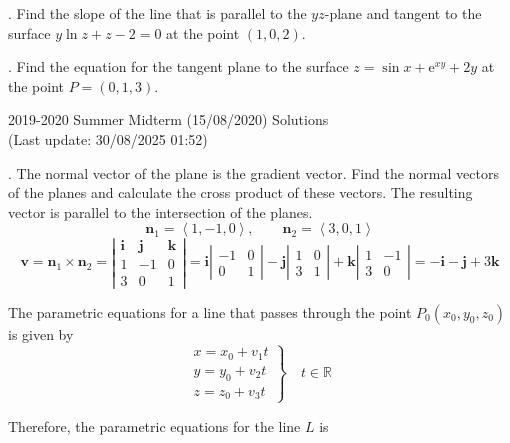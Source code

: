 \documentclass{article}
\begin{document}
\hfill

. Find the slope of the line that is parallel to the $yz$-plane and tangent to the surface $y\ln z+z-2=0$ at the point $(1,0,2)$.

\hfill

. Find the equation for the tangent plane to the surface $z=\sin x+\mathrm{e}^{xy}+2y$ at the point $P=(0,1,3)$.

\newpage

\begin{center}
2019-2020 Summer Midterm (15/08/2020) Solutions\\
(Last update: 30/08/2025 01:52)
\end{center}

. The normal vector of the plane is the gradient vector. Find the normal vectors of the planes and calculate the cross product of these vectors. The resulting vector is parallel to the intersection of the planes.
\[\mathbf{n}_1=\left\langle1,-1,0\right\rangle,\qquad \mathbf{n}_2=\left\langle3,0,1\right\rangle\]
\[\mathbf{v}=\mathbf{n}_1\times\mathbf{n}_2=\left|\begin{array}{ccc}
\mathbf{i}&\mathbf{j}&\mathbf{k}\\
1&-1&0\\
3&0&1
\end{array}\right|=\mathbf{i}\left|\begin{array}{cc}
-1&0\\0&1
\end{array}\right|-\mathbf{j}\left|\begin{array}{cc}
1&0\\3&1
\end{array}\right|+\mathbf{k}\left|\begin{array}{cc}
1&-1\\3&0
\end{array}\right|=-\mathbf{i}-\mathbf{j}+3\mathbf{k}\]

\hfill

\noindent The parametric equations for a line that passes through the point $P_0(x_0,y_0,z_0)$ is given by
\[\left.\begin{array}{c}
x=x_0+v_1t\\
y=y_0+v_2t\\
z=z_0+v_3t
\end{array}\right\}\quad t\in\mathbb{R}\]

\hfill

\noindent Therefore, the parametric equations for the line $L$ is
\end{document}
